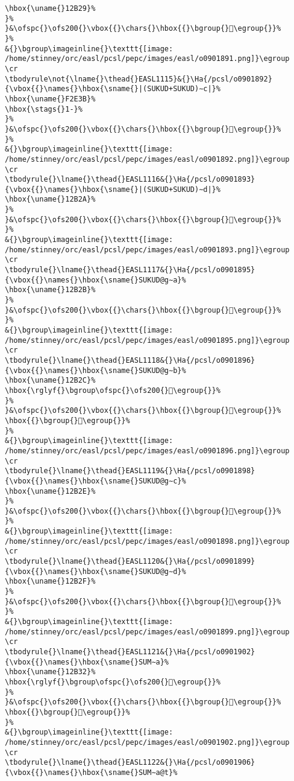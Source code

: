 \begin{verbatim}
\hbox{\uname{}12B29}%
}%
}&\ofspc{}\ofs200{}\vbox{{}\chars{}\hbox{{}\bgroup{}𒬩\egroup{}}%
}%
&{}\bgroup\imageinline{}\texttt{[image: /home/stinney/orc/easl/pcsl/pepc/images/easl/o0901891.png]}\egroup
\cr
\tbodyrule\not{\lname{}\thead{}EASL1115}&{}\Ha{/pcsl/o0901892}{\vbox{{}\names{}\hbox{\sname{}|(SUKUD+SUKUD)∼c|}%
\hbox{\uname{}F2E3B}%
\hbox{\stags{}1-}%
}%
}&\ofspc{}\ofs200{}\vbox{{}\chars{}\hbox{{}\bgroup{}󲸻\egroup{}}%
}%
&{}\bgroup\imageinline{}\texttt{[image: /home/stinney/orc/easl/pcsl/pepc/images/easl/o0901892.png]}\egroup
\cr
\tbodyrule{}\lname{}\thead{}EASL1116&{}\Ha{/pcsl/o0901893}{\vbox{{}\names{}\hbox{\sname{}|(SUKUD+SUKUD)∼d|}%
\hbox{\uname{}12B2A}%
}%
}&\ofspc{}\ofs200{}\vbox{{}\chars{}\hbox{{}\bgroup{}𒬪\egroup{}}%
}%
&{}\bgroup\imageinline{}\texttt{[image: /home/stinney/orc/easl/pcsl/pepc/images/easl/o0901893.png]}\egroup
\cr
\tbodyrule{}\lname{}\thead{}EASL1117&{}\Ha{/pcsl/o0901895}{\vbox{{}\names{}\hbox{\sname{}SUKUD@g∼a}%
\hbox{\uname{}12B2B}%
}%
}&\ofspc{}\ofs200{}\vbox{{}\chars{}\hbox{{}\bgroup{}𒬫\egroup{}}%
}%
&{}\bgroup\imageinline{}\texttt{[image: /home/stinney/orc/easl/pcsl/pepc/images/easl/o0901895.png]}\egroup
\cr
\tbodyrule{}\lname{}\thead{}EASL1118&{}\Ha{/pcsl/o0901896}{\vbox{{}\names{}\hbox{\sname{}SUKUD@g∼b}%
\hbox{\uname{}12B2C}%
\hbox{\rglyf{}\bgroup\ofspc{}\ofs200{}𒬬\egroup{}}%
}%
}&\ofspc{}\ofs200{}\vbox{{}\chars{}\hbox{{}\bgroup{}𒬬\egroup{}}%
\hbox{{}\bgroup{}𒬭\egroup{}}%
}%
&{}\bgroup\imageinline{}\texttt{[image: /home/stinney/orc/easl/pcsl/pepc/images/easl/o0901896.png]}\egroup
\cr
\tbodyrule{}\lname{}\thead{}EASL1119&{}\Ha{/pcsl/o0901898}{\vbox{{}\names{}\hbox{\sname{}SUKUD@g∼c}%
\hbox{\uname{}12B2E}%
}%
}&\ofspc{}\ofs200{}\vbox{{}\chars{}\hbox{{}\bgroup{}𒬮\egroup{}}%
}%
&{}\bgroup\imageinline{}\texttt{[image: /home/stinney/orc/easl/pcsl/pepc/images/easl/o0901898.png]}\egroup
\cr
\tbodyrule{}\lname{}\thead{}EASL1120&{}\Ha{/pcsl/o0901899}{\vbox{{}\names{}\hbox{\sname{}SUKUD@g∼d}%
\hbox{\uname{}12B2F}%
}%
}&\ofspc{}\ofs200{}\vbox{{}\chars{}\hbox{{}\bgroup{}𒬯\egroup{}}%
}%
&{}\bgroup\imageinline{}\texttt{[image: /home/stinney/orc/easl/pcsl/pepc/images/easl/o0901899.png]}\egroup
\cr
\tbodyrule{}\lname{}\thead{}EASL1121&{}\Ha{/pcsl/o0901902}{\vbox{{}\names{}\hbox{\sname{}SUM∼a}%
\hbox{\uname{}12B32}%
\hbox{\rglyf{}\bgroup\ofspc{}\ofs200{}𒬲\egroup{}}%
}%
}&\ofspc{}\ofs200{}\vbox{{}\chars{}\hbox{{}\bgroup{}𒬰\egroup{}}%
\hbox{{}\bgroup{}𒬲\egroup{}}%
}%
&{}\bgroup\imageinline{}\texttt{[image: /home/stinney/orc/easl/pcsl/pepc/images/easl/o0901902.png]}\egroup
\cr
\tbodyrule{}\lname{}\thead{}EASL1122&{}\Ha{/pcsl/o0901906}{\vbox{{}\names{}\hbox{\sname{}SUM∼a@t}%

\end{verbatim}
